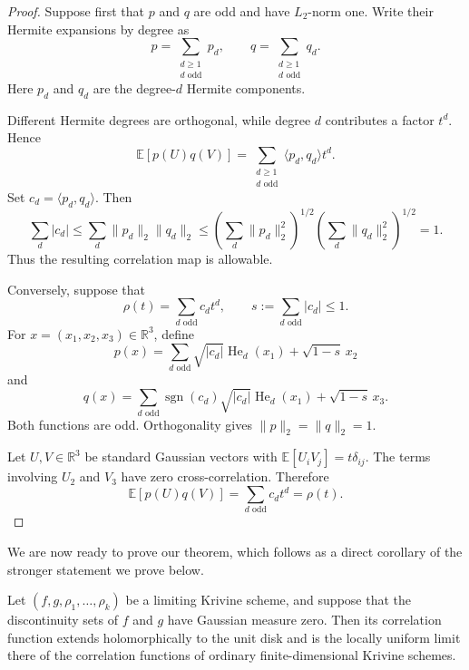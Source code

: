 \begin{proof}
Suppose first that \(p\) and \(q\) are odd and have \(L_2\)-norm one. Write
their Hermite expansions by degree as
\[
p=\sum_{\substack{d\geq 1\\ d\text{ odd}}}p_d,
\qquad
q=\sum_{\substack{d\geq 1\\ d\text{ odd}}}q_d.
\]
Here \(p_d\) and \(q_d\) are the degree-\(d\) Hermite components.

Different Hermite degrees are orthogonal, while degree \(d\) contributes a
factor \(t^d\). Hence
\[
\mathbb{E}[p(U)q(V)]
=
\sum_{\substack{d\geq 1\\ d\text{ odd}}}
\langle p_d,q_d\rangle t^d.
\]
Set \(c_d=\langle p_d,q_d\rangle\). Then
\[
\sum_d|c_d|
\leq
\sum_d\|p_d\|_2\|q_d\|_2
\leq
\left(\sum_d\|p_d\|_2^2\right)^{1/2}
\left(\sum_d\|q_d\|_2^2\right)^{1/2}
=
1.
\]
Thus the resulting correlation map is allowable.

Conversely, suppose that
\[
\rho(t)=\sum_{d\text{ odd}}c_dt^d,
\qquad
s:=\sum_{d\text{ odd}}|c_d|\leq 1.
\]
For \(x=(x_1,x_2,x_3)\in\mathbb{R}^3\), define
\[
p(x)
=
\sum_{d\text{ odd}}
\sqrt{|c_d|}\operatorname{He}_d(x_1)
+
\sqrt{1-s}\,x_2
\]
and
\[
q(x)
=
\sum_{d\text{ odd}}
\operatorname{sgn}(c_d)\sqrt{|c_d|}
\operatorname{He}_d(x_1)
+
\sqrt{1-s}\,x_3.
\]
Both functions are odd. Orthogonality gives \(\|p\|_2=\|q\|_2=1\).

Let \(U,V\in\mathbb{R}^3\) be standard Gaussian vectors with
\(\mathbb{E}[U_iV_j]=t\delta_{ij}\). The terms involving \(U_2\) and \(V_3\)
have zero cross-correlation. Therefore
\[
\mathbb{E}[p(U)q(V)]
=
\sum_{d\text{ odd}}c_dt^d
=
\rho(t).
\]
\end{proof}

We are now ready to prove our theorem, which follows as a direct corollary of the stronger statement we prove below. 

\begin{theorem}
Let \((f,g,\rho_1,\ldots,\rho_k)\) be a limiting Krivine scheme, and suppose
that the discontinuity sets of \(f\) and \(g\) have Gaussian measure zero.
Then its correlation function extends holomorphically to the unit disk and is
the locally uniform limit there of the correlation functions of ordinary
finite-dimensional Krivine schemes.
\end{theorem}

